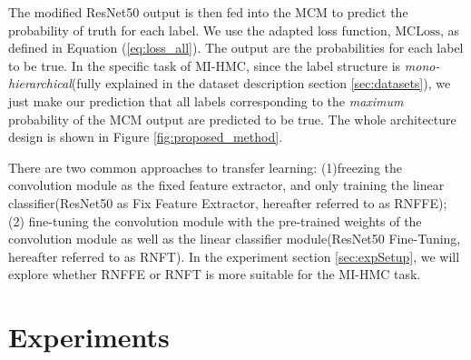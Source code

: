 \documentclass[wcp]{jmlr}
\begin{document}
The modified ResNet50 output is then fed into the MCM to predict the probability of truth for each label. We use the adapted loss function, $\mathrm{MCLoss}$, as defined in Equation (\ref{eq:loss_all}).
The output are the probabilities for each label to be true. %
In the specific task of MI-HMC, since the label structure is \textit{mono-hierarchical}(fully explained in the dataset description section \ref{sec:datasets}), we %
just make our prediction that all labels corresponding to the \textit{maximum} probability of the MCM output are predicted to be true. %
The whole architecture design is shown in Figure \ref{fig:proposed_method}.

There are two common approaches to transfer learning: (1)freezing the convolution module as the fixed feature extractor, and only training the linear classifier(ResNet50 as Fix Feature Extractor, hereafter referred to as RNFFE); (2) fine-tuning the convolution module with the pre-trained weights of the convolution module as well as the linear classifier module(ResNet50 Fine-Tuning, hereafter referred to as RNFT).
In the experiment section \ref{sec:expSetup}, we will explore whether RNFFE or RNFT is more suitable for the MI-HMC task.%

\begin{figure*}
    \begin{center}
    \end{center}
       \caption{TLMCM network architecture. The predicted labels are represented as dark blue solid circles, while the other non-predicted labels are shown as hollow circles.}
    \label{fig:proposed_method}
\end{figure*}


\section{Experiments}
\end{document}
